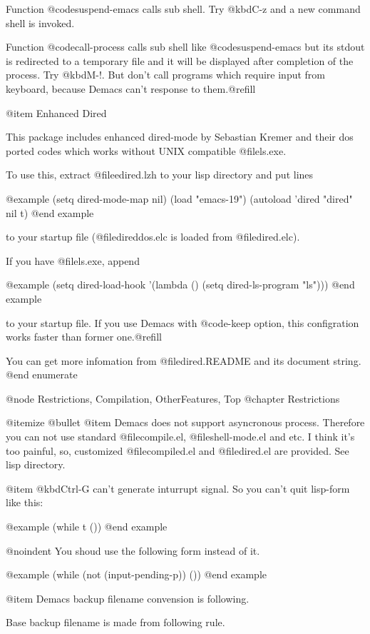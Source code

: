 Function @code{suspend-emacs} calls sub shell. Try @kbd{C-z} and a new
command shell is invoked.

Function @code{call-process} calls sub shell like @code{suspend-emacs}
but its stdout is redirected to a temporary file and it will be
displayed after completion of the process. Try @kbd{M-!}. But don't call
programs which require input from keyboard, because Demacs can't
response to them.@refill


@item
Enhanced Dired

This package includes enhanced dired-mode by Sebastian Kremer and their
dos ported codes which works without UNIX compatible @file{ls.exe}.

To use this, extract @file{edired.lzh} to your lisp directory and put
lines

@example
(setq dired-mode-map nil)
(load "emacs-19")
(autoload 'dired "dired" nil t)
@end example

to your startup file (@file{direddos.elc} is loaded from @file{dired.elc}). 

If you have @file{ls.exe}, append

@example
(setq dired-load-hook
      '(lambda ()
         (setq dired-ls-program "ls")))
@end example

to your startup file. If you use Demacs with @code{-keep} option, this
configration works faster than former one.@refill

You can get more infomation from @file{dired.README} and its document
string.
@end enumerate


@node Restrictions, Compilation, OtherFeatures, Top
@chapter Restrictions

@itemize @bullet
@item
Demacs does not support asyncronous process. Therefore you can not use
standard @file{compile.el}, @file{shell-mode.el} and etc. I think it's
too painful, so, customized @file{compiled.el} and @file{dired.el} are
provided. See lisp directory.

@item
@kbd{Ctrl-G} can't generate inturrupt signal. So you can't quit lisp-form
like this:

@example
(while t ())
@end example

@noindent
You shoud use the following form instead of it.

@example
(while (not (input-pending-p)) ())
@end example

@item
Demacs backup filename convension is following.

Base backup filename is made from following rule.

